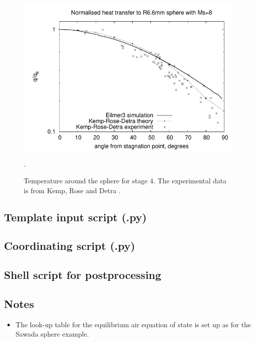 \begin{figure}[htbp]
\begin{center}
\includegraphics[width=12cm]{../2D/sphere-heat-transfer/sphere_norm_heat_transfer.pdf}
\end{center}
\caption{Temperature around the sphere for stage 4.  
   The experimental data is from Kemp, Rose and Detra \cite{kemp_etal_1959}.}.
\label{sphere-norm-heat-transfer-fig}
\end{figure}

\clearpage

\subsection{Template input script (.py)}
\topbar

\bottombar

\subsection{Coordinating script (.py)}
\topbar

\bottombar

\newpage
\subsection{Shell script for postprocessing}
\topbar

\bottombar

\newpage
\subsection{Notes}
\begin{itemize}
\item The look-up table for the equilibrium air equation of state is set up 
   as for the Sawada sphere example.
\end{itemize}
